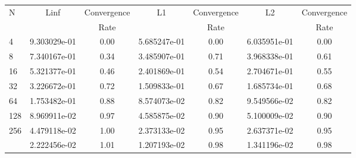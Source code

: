 \documentclass[12pt]{article}
\begin{document}
	\begin{tabular}{l|c|c|c|c|c|c}
		N&Linf&Convergence&L1&Convergence&L2&Convergence\\
		&&Rate&&Rate&&Rate\\
		\hline
		4&9.303029e-01&0.00&5.685247e-01&0.00&6.035951e-01&0.00\\
		\hline
		8&7.340167e-01&0.34&3.485907e-01&0.71&3.968338e-01&0.61\\
		\hline
		16&5.321377e-01&0.46&2.401869e-01&0.54&2.704671e-01&0.55\\
		\hline
		32&3.226672e-01&0.72&1.509833e-01&0.67&1.685734e-01&0.68\\
		\hline
		64&1.753482e-01&0.88&8.574073e-02&0.82&9.549566e-02&0.82\\
		\hline
		128&8.969911e-02&0.97&4.585875e-02&0.90&5.100009e-02&0.90\\
		\hline
		256&4.479118e-02&1.00&2.373133e-02&0.95&2.637371e-02&0.95\\
   		\hline
		512&2.222456e-02&1.01&1.207193e-02&0.98&1.341196e-02&0.98\\
	\end{tabular}
\end{document}
